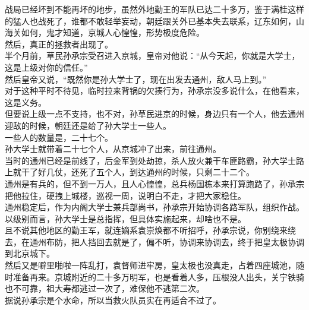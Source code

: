 \begin{multicols}{\theparacolNo}
战局已经坏到不能再坏的地步，虽然外地勤王的军队已达二十多万，鉴于满桂这样的猛人也战死了，谁都不敢轻举妄动，朝廷跟关外已基本失去联系，辽东如何，山海关如何，鬼才知道，京城人心惶惶，形势极度危险。\\

然后，真正的拯救者出现了。\\

半个月前，草民孙承宗受召进入京城，皇帝对他说：“从今天起，你就是大学士，这是上级对你的信任。”\\

然后皇帝又说，“既然你是孙大学士了，现在出发去通州，敌人马上到。”\\

对于这种平时不待见，临时拉来背锅的欠揍行为，孙承宗没多说什么，在他看来，这是义务。\\

但要说上级一点不支持，也不对，孙草民进京的时候，身边只有一个人，他去通州迎敌的时候，朝廷还是给了孙大学士一些人。\\

一些人的数量是，二十七个。\\

孙大学士就带着二十七个人，从京城冲了出来，前往通州。\\

当时的通州已经是前线了，后金军到处劫掠，杀人放火兼干车匪路霸，孙大学士路上就干了好几仗，还死了五个人，到达通州的时候，只剩二十二个。\\

通州是有兵的，但不到一万人，且人心惶惶，总兵杨国栋本来打算跑路了，孙承宗把他拉住，硬拽上城楼，巡视一周，说明白不走，才把大家稳住。\\

通州稳定后，作为内阁大学士兼兵部尚书，孙承宗开始协调各路军队，组织作战。\\

以级别而言，孙大学士是总指挥，但具体实施起来，却啥也不是。\\

且不说其他地区的勤王军，就连嫡系袁崇焕都不听招呼，孙承宗说，你别绕来绕去，在通州布防，把人挡回去就是了，偏不听，协调来协调去，终于把皇太极协调到北京城下。\\

然后又是噼里啪啦一阵乱打，袁督师进牢房，皇太极也没真走，占着四座城池，随时准备再来。京城附近的二十多万明军，也是看着人多，压根没人出头，关宁铁骑也不可靠，祖大寿都逃过一次了，难保他不逃第二次。\\

据说孙承宗是个水命，所以当救火队员实在再适合不过了。\\


\end{multicols}
